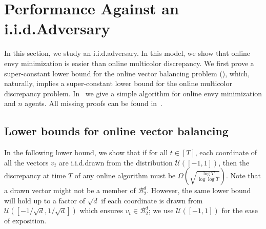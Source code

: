 \section{Performance Against an i.i.d.\@ Adversary}\label{sec: iid}

In this section, we study an i.i.d.\@ adversary. In this model, we show that online envy minimization is easier than online multicolor discrepancy.
We first prove a super-constant lower bound for the online vector balancing problem (), which, naturally, implies a super-constant lower bound for the online multicolor discrepancy problem. In~ we give a simple algorithm for online envy minimization and $n$ agents. All missing proofs can be found in~.

\subsection{Lower bounds for online vector balancing}

In the following lower bound, we show that if for all $t \in [T]$, each coordinate of all the vectors $v_t$ are i.i.d.\@ drawn from the distribution $\mathcal{U}([-1,1])$, then the discrepancy at time $T$ of any online algorithm must be $\Omega\left(\sqrt{\frac{\log{T}}{\log{\log{T}}}}\right)$. Note that a drawn vector might not be a member of $\mathcal{B}_2^d$. However, the same lower bound will hold up to a factor of $\sqrt{d}$ if each coordinate is drawn from $\mathcal{U}([-1/\sqrt{d},1/\sqrt{d}])$ which ensures $v_t \in \mathcal{B}_2^d$; we use $\mathcal{U}([-1,1])$ for the ease of exposition.

